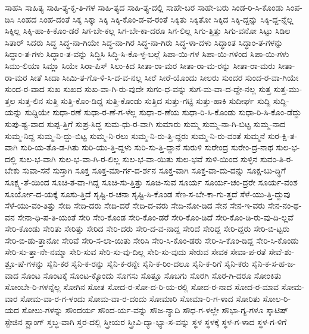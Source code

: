 {ಸಾಹಸಿ
ಸಾಹಿತ್ಯ
ಸಾಹಿ-ತ್ಯ-ಕೃ-ತಿ-ಗಳ
ಸಾಹಿ-ತ್ಯದ
ಸಾಹಿ-ತ್ಯ-ದಲ್ಲಿ
ಸಾಹೇ-ಬರ
ಸಾಹೇ-ಬರು
ಸಿಂಡ-ರಿ-ಸಿ-ಕೊಂಡು
ಸಿಂಪ-ಡಿಸಿ
ಸಿಂಹದ
ಸಿಂಹ-ದಂತೆ
ಸಿಕ್ಕ
ಸಿಕ್ಕಾ
ಸಿಕ್ಕಿ
ಸಿಕ್ಕಿ-ಕೊಂ-ಡ-ವ-ರಂತೆ
ಸಿಕ್ಕಿತು
ಸಿಕ್ಕಿತೋ
ಸಿಕ್ಕಿದ
ಸಿಕ್ಕಿ-ದ್ದನ್ನು
ಸಿಕ್ಕಿ-ದ್ದ-ನ್ನೆಲ್ಲ
ಸಿಕ್ಕಿಲ್ಲ
ಸಿಕ್ಕಿ-ಹಾ-ಕಿ-ಕೊಂ-ಡರೆ
ಸಿಗ-ಬೇ-ಕಲ್ಲ
ಸಿಗ-ಬೇ-ಕಾ-ದರೂ
ಸಿಗ-ಲಿಲ್ಲ
ಸಿಗು-ತ್ತಿತ್ತು
ಸಿಗು-ವನೋ
ಸಿಟ್ಟು
ಸಿಡಿಲ
ಸಿತಾರ್
ಸಿದರು
ಸಿದ್ಧ
ಸಿದ್ಧ-ನಾ-ಗಿಯೇ
ಸಿದ್ಧ-ನಾ-ಗಿರ
ಸಿದ್ಧ-ನಾ-ಗಿರು
ಸಿದ್ಧ-ಳಾ-ದಳು
ಸಿದ್ಧಾಂತ
ಸಿದ್ಧಾಂ-ತ-ಗಳನ್ನು
ಸಿದ್ಧಾಂ-ತ-ಗಳು
ಸಿದ್ಧಾಂ-ತ-ವನ್ನು
ಸಿದ್ಧಿಸಿ
ಸಿದ್ಧಿ-ಸಿ-ಕೊ-ಳ್ಳ-ಬಲ್ಲೆ
ಸಿಪಾ-ಯಿ-ಗಳ
ಸಿಪಾ-ಯಿ-ಗಳಿಂದ
ಸಿಪಾ-ಯಿ-ಗಳು
ಸಿಮು-ಲಿಯಾ
ಸಿಮ್ಲಾ
ಸಿಯೇ
ಸಿರಾ-ಪಿಸ್
ಸಿಲು-ಕಿದ
ಸೀತಾ-ರಾ-ಮರ
ಸೀತಾ-ರಾ-ಮ-ರನ್ನು
ಸೀತಾ-ರಾ-ಮರು
ಸೀತಾ-ರಾ-ಮರ
ಸೀತೆ
ಸೀದಾ
ಸೀಮಿ-ತ-ಗೊ-ಳಿ-ಸಿ-ದ-ವ-ನಲ್ಲ
ಸೀರೆ
ಸೀರೆ-ಯೊಂದು
ಸೀಲರು
ಸುಂದರ
ಸುಂದ-ರ-ವಾ-ಗಿಯೇ
ಸುಂದ-ರ-ವಾದ
ಸುಖ
ಸುಖದ
ಸುಖ-ವಾ-ಗಿ-ರು-ವುದೇ
ಸುಗಂ-ಧ-ವನ್ನು
ಸುಗ-ಮ-ವಾ-ದ-ದ್ದೇ-ನಲ್ಲ
ಸುತ್ತ
ಸುತ್ತ-ಮು-ತ್ತಲ
ಸುತ್ತ-ಲಿನ
ಸುತ್ತಿ
ಸುತ್ತಿ-ಕೊಂ-ಡಿದ್ದ
ಸುತ್ತಿ-ಕೊಂಡು
ಸುತ್ತಿದ
ಸುತ್ತು-ಗಟ್ಟಿ
ಸುತ್ತು-ಹಾಕಿ
ಸುದೀರ್ಘ
ಸುದ್ದಿ
ಸುದ್ದಿ-ಯನ್ನು
ಸುದ್ದಿಯೇ
ಸುಧಾ-ರಣೆ
ಸುಧಾ-ರ-ಣೆ-ಗ-ಳೆಲ್ಲ
ಸುಧಾ-ರ-ಣೆಯ
ಸುಧಾ-ರಿ-ಸಿ-ಕೊಂಡು
ಸುಧಾ-ರಿ-ಸಿ-ಕೊಂ-ಡೆದ್ದು
ಸುಪು-ಷ್ಟ-ವಾದ
ಸುಪ್ಪ-ತ್ತಿಗೆ
ಸುಪ್ರ-ಸಿದ್ಧ
ಸುಮ-ಧು-ರ-ವಾಗಿ
ಸುಮಾರು
ಸುಮ್ಮ
ಸುಮ್ಮ-ನಾ-ಗಿ-ಬಿಟ್ಟ
ಸುಮ್ಮ-ನಾದ
ಸುಮ್ಮ-ನಿದ್ದ
ಸುಮ್ಮ-ನಿ-ದ್ದು-ಬಿಟ್ಟ
ಸುಮ್ಮ-ನಿ-ರಲು
ಸುಮ್ಮ-ನಿ-ರು-ತ್ತಿ-ದ್ದರು
ಸುಮ್ಮ-ನಿ-ರು-ವಂತೆ
ಸುಮ್ಮನೆ
ಸುರ-ಕ್ಷಿ-ತ-ವಾಗಿ
ಸುರಿ-ಯ-ತೊ-ಡ-ಗಿತು
ಸುರಿ-ಯು-ತ್ತಿ-ದ್ದಳು
ಸುರಿ-ಸು-ತ್ತಿ-ದ್ದಾನೆ
ಸುರುಳಿ
ಸುರೇಂದ್ರ
ಸುರೇಂ-ದ್ರ-ನಾಥ
ಸುಲ-ಭ-ದಲ್ಲಿ
ಸುಲ-ಭ-ವಾಗಿ
ಸುಲ-ಭ-ವಾ-ಗಿ-ರ-ಲಿಲ್ಲ
ಸುಲ-ಭ-ವಾ-ಯಿತು
ಸುಲ-ಭವೆ
ಸುಳಿ-ಯಿಂದ
ಸುಳ್ಳಿನ
ಸುವಂ-ತಿ-ರ-ಬೇಕು
ಸುವಾ-ಸನೆ
ಸುಸ್ತಾಗಿ
ಸೂಕ್ತ
ಸೂಕ್ತ-ಮಾ-ರ್ಗ-ದ-ರ್ಶನ
ಸೂಕ್ತ-ವಾಗಿ
ಸೂಕ್ತ-ವಾ-ದು-ದನ್ನು
ಸೂಕ್ಷ-ಬು-ದ್ಧಿಗೆ
ಸೂಕ್ಷ್ಮ-ತೆ-ಯಿಂದ
ಸೂಚಿ-ತ-ವಾ-ಗಿದ್ದ
ಸೂಚಿ-ಸು-ತ್ತಿತ್ತು
ಸೂಚಿ-ಸುವ
ಸೂರ್ಯ
ಸೂರ್ಯ-ಚಂ-ದ್ರರೇ
ಸೂರ್ಯ-ವಂಶ
ಸೂರ್ಯೋ-ದ-ಯಕ್ಕೆ
ಸೂಸು-ತ್ತಿದೆ
ಸೃಷ್ಟಿ-ರ-ಚನಾ
ಸೃಷ್ಟಿ-ಸಿ-ಕೊಂಡ
ಸೆಣ-ಸ-ಬೇ-ಕಾ-ಗು-ತ್ತದೆ
ಸೆಳೆ-ಯು-ತ್ತಿ-ದ್ದುವು
ಸೆಳೆ-ಯು-ವಂ-ತಿತ್ತು
ಸೇದಿ
ಸೇದಿ-ದರು
ಸೇದಿ-ದರೆ
ಸೇದಿ-ದ-ವರು
ಸೇದಿ-ನೋ-ಡಿದ
ಸೇನ
ಸೇನ-ಇ-ವರು
ಸೇನ-ನಂ-ಥ-ವನ
ಸೇನಾ-ಧಿ-ಪ-ತಿ-ಯಂತೆ
ಸೇರಿ
ಸೇರಿ-ಕೊಂಡ
ಸೇರಿ-ಕೊಂ-ಡರೆ
ಸೇರಿ-ಕೊಂ-ಡಿದೆ
ಸೇರಿ-ಕೊಂ-ಡಿ-ರು-ವು-ದಿ-ಲ್ಲವೆ
ಸೇರಿ-ಕೊಂಡು
ಸೇರಿತು
ಸೇರಿತ್ತು
ಸೇರಿದ
ಸೇರಿ-ದರು
ಸೇರಿ-ದ-ವ-ನಾದ್ದ
ಸೇರಿದೆ
ಸೇರಿದ್ದ
ಸೇರಿ-ದ್ದರು
ಸೇರಿ-ಬಿ-ಟ್ಟರು
ಸೇರಿ-ಬಿ-ಡು-ತ್ತಾನೋ
ಸೇರಿವೆ
ಸೇರಿ-ಸ-ಲಾ-ಯಿತು
ಸೇರಿಸಿ
ಸೇರಿ-ಸಿ-ಕೊಂ-ಡರು
ಸೇರಿ-ಸಿ-ಕೊಂ-ಡಿದ್ದ
ಸೇರಿ-ಸಿ-ಕೊಂಡು
ಸೇರಿ-ಸು-ತ್ತಾ-ನೇ-ನಮ್ಮಾ
ಸೇರಿ-ಸುವ
ಸೇರಿ-ಸು-ವು-ದಿಲ್ಲ
ಸೇರಿ-ಸು-ವುದು
ಸೇರುವ
ಸೇವಕ
ಸೇವಾ-ಪ-ರತೆ
ಸೇವೆ-ಶು-ಶ್ರೂ-ಷೆ-ಗಳನ್ನು
ಸೈನಿ-ಕರ
ಸೈನಿ-ಕ-ರನ್ನು
ಸೈನಿ-ಕ-ರನ್ನೇ
ಸೈನಿ-ಕ-ರಿಂ-ದಲೂ
ಸೈನಿ-ಕ-ರಿಗೆ
ಸೈನಿ-ಕರು
ಸೈನಿ-ಕ-ಸ-ಹ-ಜ-ವಾದ
ಸೊಂಟ
ಸೊಂಟಕ್ಕೆ
ಸೊಂಟ-ಕ್ಕೊಂದು
ಸೊಗಸು
ಸೊತ್ತೂ
ಸೊಬಗು
ಸೊರಗಿ
ಸೊರ-ಗಿ-ದರೂ
ಸೋಂಕಿತು
ಸೋಂಬೇ-ರಿ-ಗಳನ್ನೆಲ್ಲ
ಸೋಗಿನ
ಸೋತ
ಸೋದ-ರ-ಸೋ-ದ-ರಿ-ಯ-ರಲ್ಲಿ
ಸೋದ-ರ-ನಾದ
ಸೋದ-ರ-ಮಾವ
ಸೋಮ-ವಾರ
ಸೋಮ-ವಾ-ರ-ಗ-ಳಂದು
ಸೋಮ-ವಾ-ರ-ದಂದು
ಸೋಮಾರಿ
ಸೋಮಾ-ರಿ-ಗ-ಳಾದ
ಸೋರಿತು
ಸೋಲ-ರಿ-ಯದ
ಸೋಲು-ಗಳನ್ನು
ಸೌಂದರ್ಯ
ಸೌಂದ-ರ್ಯ-ವನ್ನು
ಸೌಜ-ನ್ಯಾದಿ
ಸೌಧ-ಗ-ಳಲ್ಲೇ
ಸೌಭಾ-ಗ್ಯ-ಗಳೂ
ಸ್ಕಾಟಿಷ್
ಸ್ಟೇಜಿನ
ಸ್ಟ್ರಾಂಗ್
ಸ್ತಬ್ಧ-ವಾಗಿ
ಸ್ತರ-ದಲ್ಲಿ
ಸ್ತ್ರೀಯರ
ಸ್ತ್ರೀವಿ-ದ್ಯಾ-ಭ್ಯಾ-ಸ-ವನ್ನು
ಸ್ಥಳ
ಸ್ಥಳಕ್ಕೆ
ಸ್ಥಳ-ಗ-ಳಾದ
ಸ್ಥಳ-ಗ-ಳಿಗೆ
}
